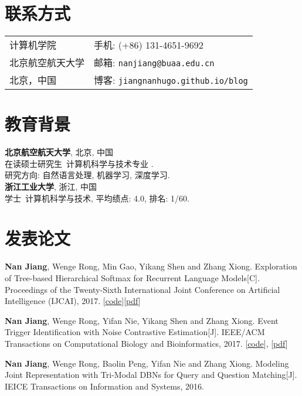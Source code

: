 \documentclass[margin,line]{resume}
\begin{document}
\begin{resume}


\section{联系方式}
\begin{tabular}{@{}p{3in}p{3in}}
计算机学院 & { 手机:}  (+86) 131-4651-9692 \\
北京航空航天大学  & { 邮箱:}  {\tt nanjiang@buaa.edu.cn} \\
北京，中国         & { 博客:} {\tt jiangnanhugo.github.io/blog} \\
\end{tabular}


\section{教育背景}
{\bf 北京航空航天大学}, 北京,  中国\\
在读硕士研究生\ 计算机科学与技术专业 . \\
研究方向: 自然语言处理, 机器学习, 深度学习. \\


{\bf 浙江工业大学}, 浙江, 中国\\
学士\ 计算机科学与技术, 平均绩点: 4.0, 排名: 1/60.


\section{发表论文}

\textbf{Nan Jiang}, Wenge Rong, Min Gao, Yikang Shen and Zhang Xiong. Exploration of Tree-based Hierarchical Softmax for Recurrent Language Models[C]. Proceedings of the Twenty-Sixth International Joint Conference on Artificial Intelligence (IJCAI), 2017. [\href{https://github.com/jiangnanHugo/lmkit}{code}][\href{https://www.ijcai.org/proceedings/2017/0271.pdf}{pdf}]

\textbf{Nan Jiang}, Wenge Rong, Yifan Nie, Yikang Shen and Zhang Xiong. Event Trigger Identification with Noise Contrastive Estimation[J]. IEEE/ACM Transactions on Computational Biology and Bioinformatics, 2017. [\href{https://github.com/jiangnanHugo/mlee-nce}{code}], [\href{https://github.com/jiangnanhugo/paper/blob/master/APBC2017/APBC2017.pdf}{pdf}]

\textbf{Nan Jiang}, Wenge Rong, Baolin Peng, Yifan Nie and Zhang Xiong. Modeling Joint Representation with Tri-Modal DBNs for Query and Question Matching[J]. IEICE Transactions on Information and Systems, 2016.


\end{resume}
\end{document}
